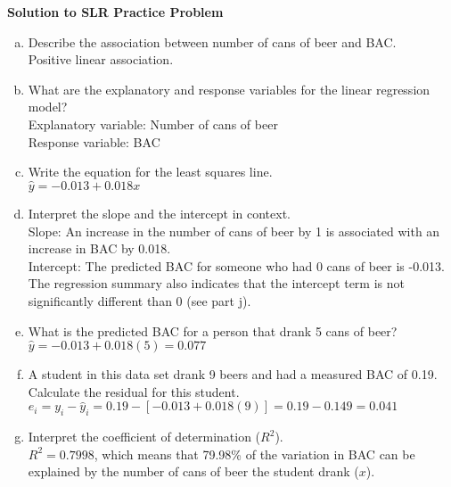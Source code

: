 \documentclass[11pt]{article}\usepackage[]{graphicx}\usepackage[]{color}
\begin{document}
\setlength\parindent{0pt}
\textbf{Solution to SLR Practice Problem}\\

\begin{enumerate}[(a)]
\item Describe the association between number of cans of beer and BAC.\\
Positive linear association.\\

\item What are the explanatory and response variables for the linear regression model?\\
Explanatory variable: Number of cans of beer\\
Response variable: BAC\\

\item Write the equation for the least squares line.\\
$\hat{y} = -0.013 + 0.018x$\\

\item Interpret the slope and the intercept in context.\\
Slope: An increase in the number of cans of beer by 1 is associated with an increase in BAC by 0.018.\\
Intercept:  The predicted BAC for someone who had 0 cans of beer is -0.013.  The regression summary also indicates that the intercept term is not significantly different than 0 (see part j).\\

\item What is the predicted BAC for a person that drank 5 cans of beer?\\
$\hat{y} = -0.013 + 0.018(5) = 0.077$\\

\item A student in this data set drank 9 beers and had a measured BAC of 0.19. Calculate the residual for this student.\\
$e_i = y_i - \hat{y}_i = 0.19 - [-0.013 + 0.018(9)] = 0.19 - 0.149 = 0.041$\\

\item Interpret the coefficient of determination ($R^2$).\\
$R^2 = 0.7998$, which means that 79.98\% of the variation in BAC can be explained by the number of cans of beer the student drank ($x$).\\


\end{enumerate}
\end{document}
